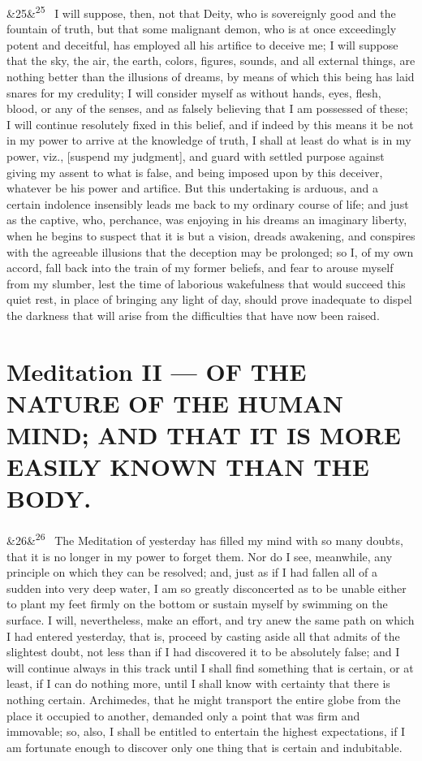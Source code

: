 \documentclass[12pt]{article}
\newcommand{\para}[1][]{\par\noindent\ifx&#1&\else\textsuperscript{\footnotesize #1}~\fi}
\begin{document}
\para[25] I will suppose, then, not that Deity, who is sovereignly good and the fountain of truth, but that some malignant demon, who is at once exceedingly potent and deceitful, has employed all his artifice to deceive me; I will suppose that the sky, the air, the earth, colors, figures, sounds, and all external things, are nothing better than the illusions of dreams, by means of which this being has laid snares for my credulity; I will consider myself as without hands, eyes, flesh, blood, or any of the senses, and as falsely believing that I am possessed of these; I will continue resolutely fixed in this belief, and if indeed by this means it be not in my power to arrive at the knowledge of truth, I shall at least do what is in my power, viz., [suspend my judgment], and guard with settled purpose against giving my assent to what is false, and being imposed upon by this deceiver, whatever be his power and artifice. But this undertaking is arduous, and a certain indolence insensibly leads me back to my ordinary course of life; and just as the captive, who, perchance, was enjoying in his dreams an imaginary liberty, when he begins to suspect that it is but a vision, dreads awakening, and conspires with the agreeable illusions that the deception may be prolonged; so I, of my own accord, fall back into the train of my former beliefs, and fear to arouse myself from my slumber, lest the time of laborious wakefulness that would succeed this quiet rest, in place of bringing any light of day, should prove inadequate to dispel the darkness that will arise from the difficulties that have now been raised.

\section*{Meditation II --- OF THE NATURE OF THE HUMAN MIND; AND THAT IT IS MORE EASILY KNOWN THAN THE BODY.}

\para[26] The Meditation of yesterday has filled my mind with so many doubts, that it is no longer in my power to forget them. Nor do I see, meanwhile, any principle on which they can be resolved; and, just as if I had fallen all of a sudden into very deep water, I am so greatly disconcerted as to be unable either to plant my feet firmly on the bottom or sustain myself by swimming on the surface. I will, nevertheless, make an effort, and try anew the same path on which I had entered yesterday, that is, proceed by casting aside all that admits of the slightest doubt, not less than if I had discovered it to be absolutely false; and I will continue always in this track until I shall find something that is certain, or at least, if I can do nothing more, until I shall know with certainty that there is nothing certain. Archimedes, that he might transport the entire globe from the place it occupied to another, demanded only a point that was firm and immovable; so, also, I shall be entitled to entertain the highest expectations, if I am fortunate enough to discover only one thing that is certain and indubitable.
\end{document}
